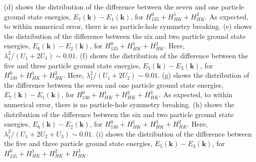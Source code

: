 \documentclass[prb,aps,amssymb,twocolumn,notitlepage]{revtex4-2}
\begin{document}
\begin{figure*}
{(d) shows the distribution of the difference between the seven and one particle ground state energies, $E_{7}(\mathbf{k})-E_{1}(\mathbf{k})$, for $H^{0}_{135}+H^{1}_{HK}+H^{2}_{HK}$. 
As expected, to within numerical error, there is no particle-hole symmetry breaking.
(e) shows the distribution of the difference between the six and two particle ground state energies, $E_{6}(\mathbf{k})-E_{2}(\mathbf{k})$, for $H^{0}_{135}+H^{1}_{HK}+H^{2}_{HK}$. 
Here, $\lambda^2_{1}/(U_{1}+2U_{1})\sim 0.01$.
(f) shows the distribution of the difference between the five and three particle ground state energies, $E_{5}(\mathbf{k})-E_{3}(\mathbf{k})$, for $H^{0}_{130}+H^{1}_{HK}+H^{2}_{HK}$. 
Here, $\lambda^2_{1}/(U_{1}+2U_{2})\sim 0.01$.
(g) shows the distribution of the difference between the seven and one particle ground state energies, $E_{7}(\mathbf{k})-E_{1}(\mathbf{k})$, for $H^{0}_{130}+H^{1}_{HK}+H^{2}_{HK}+H^{3}_{HK}$. 
As expected, to within numerical error, there is no particle-hole symmetry breaking.
(h) shows the distribution of the difference between the six and two particle ground state energies, $E_{6}(\mathbf{k})-E_{2}(\mathbf{k})$, for $H^{0}_{130}+H^{1}_{HK}+H^{3}_{HK}+H^{2}_{HK}$. 
Here, $\lambda^2_{1}/(U_{1}+2U_{2}+U_{3})\sim 0.01$.
(i) shows the distribution of the difference between the five and three particle ground state energies, $E_{5}(\mathbf{k})-E_{3}(\mathbf{k})$, for $H^{0}_{135}+H^{1}_{HK}+H^{2}_{HK}+H^{3}_{HK}$. 
}


\label{fig:ParticleHoleBrillouinZone130}
\end{figure*}
\end{document}
